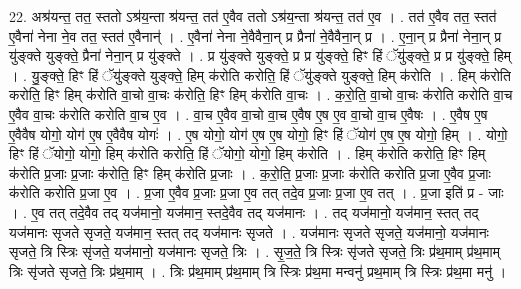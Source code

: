 \documentclass[17pt]{extarticle}
\begin{document}
22. अश्र॑यन्त॒ तत॒ स्ततो ऽश्र॑य॒न्ता श्र॑यन्त॒ तत॑ ए॒वैव ततो ऽश्र॑य॒न्ता श्र॑यन्त॒ तत॑ ए॒व । . तत॑ ए॒वैव तत॒ स्तत॑ ए॒वैना॑ नेना ने॒व तत॒ स्तत॑ ए॒वैनान्॑ । . ए॒वैना॑ नेना ने॒वैवैना॒न् प्र प्रैना॑ ने॒वैवैना॒न् प्र । . ए॒ना॒न् प्र प्रैना॑ नेना॒न् प्र यु॑ङ्क्ते युङ्क्ते॒ प्रैना॑ नेना॒न् प्र यु॑ङ्क्ते । . प्र यु॑ङ्क्ते युङ्क्ते॒ प्र प्र यु॑ङ्क्ते॒ हिꣳ हिं ॅयु॑ङ्क्ते॒ प्र प्र यु॑ङ्क्ते॒ हिम् । . यु॒ङ्क्ते॒ हिꣳ हिं ॅयु॑ङ्क्ते युङ्क्ते॒ हिम् क॑रोति करोति॒ हिं ॅयु॑ङ्क्ते युङ्क्ते॒ हिम् क॑रोति । . हिम् क॑रोति करोति॒ हिꣳ हिम् क॑रोति वा॒चो वा॒चः क॑रोति॒ हिꣳ हिम् क॑रोति वा॒चः । . क॒रो॒ति॒ वा॒चो वा॒चः क॑रोति करोति वा॒च ए॒वैव वा॒चः क॑रोति करोति वा॒च ए॒व । . वा॒च ए॒वैव वा॒चो वा॒च ए॒वैष ए॒ष ए॒व वा॒चो वा॒च ए॒वैषः । . ए॒वैष ए॒ष ए॒वैवैष योगो॒ योग॑ ए॒ष ए॒वैवैष योगः॑ । . ए॒ष योगो॒ योग॑ ए॒ष ए॒ष योगो॒ हिꣳ हिं ॅयोग॑ ए॒ष ए॒ष योगो॒ हिम् । . योगो॒ हिꣳ हिं ॅयोगो॒ योगो॒ हिम् क॑रोति करोति॒ हिं ॅयोगो॒ योगो॒ हिम् क॑रोति । . हिम् क॑रोति करोति॒ हिꣳ हिम् क॑रोति प्र॒जाः प्र॒जाः क॑रोति॒ हिꣳ हिम् क॑रोति प्र॒जाः । . क॒रो॒ति॒ प्र॒जाः प्र॒जाः क॑रोति करोति प्र॒जा ए॒वैव प्र॒जाः क॑रोति करोति प्र॒जा ए॒व । . प्र॒जा ए॒वैव प्र॒जाः प्र॒जा ए॒व तत् तदे॒व प्र॒जाः प्र॒जा ए॒व तत् । . प्र॒जा इति॑ प्र - जाः । . ए॒व तत् तदे॒वैव तद् यज॑मानो॒ यज॑मान॒ स्तदे॒वैव तद् यज॑मानः । . तद् यज॑मानो॒ यज॑मान॒ स्तत् तद् यज॑मानः सृजते सृजते॒ यज॑मान॒ स्तत् तद् यज॑मानः सृजते । . यज॑मानः सृजते सृजते॒ यज॑मानो॒ यज॑मानः सृजते॒ त्रि स्त्रिः सृ॑जते॒ यज॑मानो॒ यज॑मानः सृजते॒ त्रिः । . सृ॒ज॒ते॒ त्रि स्त्रिः सृ॑जते सृजते॒ त्रिः प्र॑थ॒माम् प्र॑थ॒माम् त्रिः सृ॑जते सृजते॒ त्रिः प्र॑थ॒माम् । . त्रिः प्र॑थ॒माम् प्र॑थ॒माम् त्रि स्त्रिः प्र॑थ॒मा मन्वनु॑ प्रथ॒माम् त्रि स्त्रिः प्र॑थ॒मा मनु॑ । \newline
\end{document}
